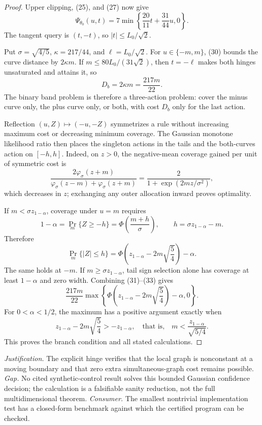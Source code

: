 \documentclass{article}
\begin{document}
\begin{proof}
Upper clipping, (25), and (27) now give
\[
 \Psi_{\theta_0}(u,t)
 =7\min\!\left\{\frac{20}{11}t+\frac{31}{44}u,0\right\}.
\tag{30}
\]
The tangent query is \((t,-t)\), so \(|t|\leq L_0/\sqrt2\).

Put \(\sigma=\sqrt{4/5}\), \(\kappa=217/44\), and \(\ell=L_0/\sqrt2\).  For \(u\in\{-m,m\}\), (30) bounds the curve distance by \(2\kappa m\).  If \(m\leq80L_0/(31\sqrt2)\), then \(t=-\ell\) makes both hinges unsaturated and attains it, so
\[
 D_b=2\kappa m=\frac{217m}{22}.
\tag{31}
\]
The binary band problem is therefore a three-action problem: cover the minus curve only, the plus curve only, or both, with cost \(D_b\) only for the last action.

Reflection \((u,Z)\mapsto(-u,-Z)\) symmetrizes a rule without increasing maximum cost or decreasing minimum coverage.  The Gaussian monotone likelihood ratio then places the singleton actions in the tails and the both-curves action on \([-h,h]\).  Indeed, on \(z>0\), the negative-mean coverage gained per unit of symmetric cost is
\[
 \frac{2\varphi_\sigma(z+m)}
 {\varphi_\sigma(z-m)+\varphi_\sigma(z+m)}
 =\frac{2}{1+\exp(2mz/\sigma^2)},
\]
which decreases in \(z\); exchanging any outer allocation inward proves optimality.

If \(m<\sigma z_{1-\alpha}\), coverage under \(u=m\) requires
\[
 1-\alpha=\Pr_m\{Z\geq-h\}
 =\Phi\!\left(\frac{m+h}{\sigma}\right),\qquad
 h=\sigma z_{1-\alpha}-m.
\tag{32}
\]
Therefore
\[
 \Pr_m\{|Z|\leq h\}
 =\Phi\!\left(z_{1-\alpha}-2m\sqrt{\frac54}\right)-\alpha.
\tag{33}
\]
The same holds at \(-m\).  If \(m\geq\sigma z_{1-\alpha}\), tail sign selection alone has coverage at least \(1-\alpha\) and zero width.  Combining (31)--(33) gives
\[
 \frac{217m}{22}
 \max\!\left\{
 \Phi\!\left(z_{1-\alpha}-2m\sqrt{\frac54}\right)-\alpha,0
 \right\}.
\tag{34}
\]
For \(0<\alpha<1/2\), the maximum has a positive argument exactly when
\[
 z_{1-\alpha}-2m\sqrt{\frac54}>-z_{1-\alpha},
 \quad\text{that is,}\quad
 m<\frac{z_{1-\alpha}}{\sqrt{5/4}}.
\]
This proves the branch condition and all stated calculations.
\end{proof}
\par\smallskip\noindent \textit{Justification.} The explicit hinge verifies that the local graph is nonconstant at a moving boundary and that zero extra simultaneous-graph cost remains possible. \textit{Gap.} No cited synthetic-control result solves this bounded Gaussian confidence decision; the calculation is a falsifiable sanity reduction, not the full multidimensional theorem. \textit{Consumer.} The smallest nontrivial implementation test has a closed-form benchmark against which the certified program can be checked.
\end{document}

